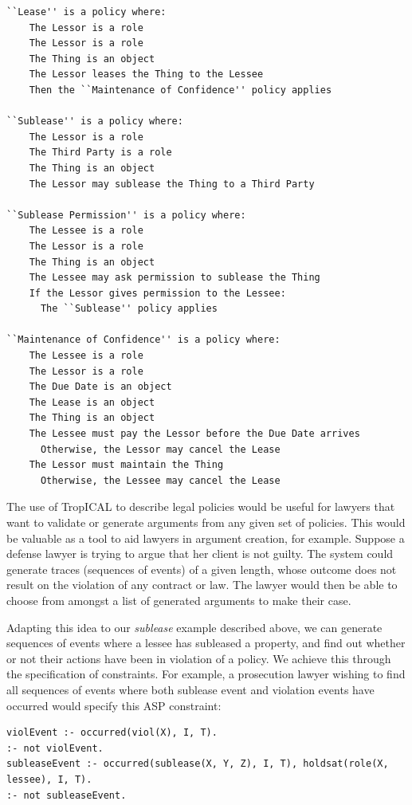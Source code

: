 \documentclass[11pt]{report}
\begin{document}
\begin{lstlisting}[label={list:policies},caption={Example policies in TropICAL}]
``Lease'' is a policy where:
    The Lessor is a role
    The Lessor is a role
    The Thing is an object
    The Lessor leases the Thing to the Lessee
    Then the ``Maintenance of Confidence'' policy applies

``Sublease'' is a policy where:
    The Lessor is a role
    The Third Party is a role
    The Thing is an object
    The Lessor may sublease the Thing to a Third Party 

``Sublease Permission'' is a policy where:
    The Lessee is a role
    The Lessor is a role
    The Thing is an object
    The Lessee may ask permission to sublease the Thing
    If the Lessor gives permission to the Lessee:
      The ``Sublease'' policy applies

``Maintenance of Confidence'' is a policy where:
    The Lessee is a role
    The Lessor is a role
    The Due Date is an object
    The Lease is an object
    The Thing is an object
    The Lessee must pay the Lessor before the Due Date arrives
      Otherwise, the Lessor may cancel the Lease
    The Lessor must maintain the Thing
      Otherwise, the Lessee may cancel the Lease
\end{lstlisting}

The use of TropICAL to describe legal policies would be useful for lawyers that
want to validate or generate arguments from any given set of policies. This would be valuable as a tool
to aid lawyers in argument creation, for example.
Suppose a defense lawyer is trying to argue that her client
is not guilty. The system could generate traces (sequences of events) of a
given length, whose outcome does not result on the violation of any contract
or law. The lawyer would then be able to choose from amongst a list of
generated arguments to make their case. 

Adapting this idea to our \emph{sublease} example described above,
we can generate sequences of events where a lessee has
subleased a property, and find out whether or not their actions have been in
violation of a policy. We achieve this through the specification of constraints.
For example, a prosecution lawyer wishing to find all sequences of events where
both sublease event and violation events have occurred would specify this ASP
constraint:

\begin{lstlisting}
violEvent :- occurred(viol(X), I, T).
:- not violEvent.
subleaseEvent :- occurred(sublease(X, Y, Z), I, T), holdsat(role(X, lessee), I, T).
:- not subleaseEvent.
\end{lstlisting}
\end{document}
